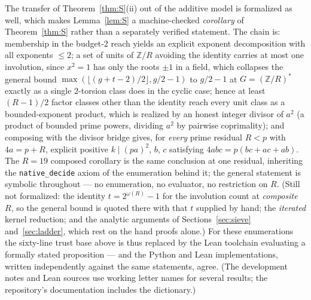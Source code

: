 \documentclass[11pt]{article}
\theoremstyle{plain}
\theoremstyle{remark}
\theoremstyle{plain}
\numberwithin{equation}{section}
\begin{document}
The transfer of Theorem~\ref{thm:S}(ii) out of the additive model is
formalized as well, which makes Lemma~\ref{lem:S} a machine-checked
\emph{corollary} of Theorem~\ref{thm:S} rather than a separately
verified statement. The chain is: membership in the budget-2 reach
yields an explicit exponent decomposition with all exponents
$\le 2$; a set of units of $\mathbb{Z}/R$ avoiding the identity
carries at most one involution, since $x^2 = 1$ has only the roots
$\pm 1$ in a field, which collapses the general bound
$\max(\lfloor (g+t-2)/2\rfloor, g/2-1)$ to $g/2 - 1$ at
$G = (\mathbb{Z}/R)^*$ exactly as a single $2$-torsion class does in
the cyclic case; hence at least $(R-1)/2$ factor classes other than
the identity reach every unit class as a bounded-exponent product,
which is realized by an honest integer divisor of $a^2$ (a product of
bounded prime powers, dividing $a^2$ by pairwise coprimality); and
composing with the divisor bridge gives, for \emph{every} prime
residual $R < p$ with $4a = p+R$, explicit positive $k \mid (pa)^2$,
$b$, $c$ satisfying $4abc = p(bc+ac+ab)$. The $R = 19$ composed
corollary is the same conclusion at one residual, inheriting the
\texttt{native\_decide} axiom of the enumeration behind it; the
general statement is symbolic throughout --- no enumeration, no
evaluator, no restriction on $R$. (Still not formalized: the identity
$t = 2^{\omega(R)}-1$ for the involution count at \emph{composite}
$R$, so the general bound is quoted there with that $t$ supplied by
hand; the \emph{iterated} kernel reduction; and the analytic
arguments of Sections~\ref{sec:sieve} and~\ref{sec:ladder}, which
rest on the hand proofs alone.) For these
enumerations the sixty-line trust base above is thus replaced by the
Lean toolchain evaluating a formally stated proposition --- and the
Python and Lean implementations, written independently against the
same statements, agree. (The development notes and Lean sources use
working letter names for several results; the repository's
documentation includes the dictionary.)
\end{document}
